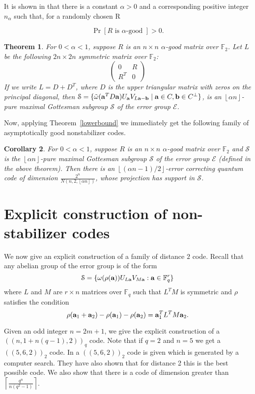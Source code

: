 \documentclass{Rinton-P9x6}
\newtheorem{theorem}{Theorem}[section]
\newtheorem{corollary}[theorem]{Corollary}
\newcommand{\floor}[1]{\ensuremath{\left\lfloor{#1}\right\rfloor}}
\newcommand{\F}{\ensuremath{\mathbb{F}}}
\newcommand{\GF}[2][]{{\ensuremath{\mathbb{F}_{#2}^{#1}}}}
\renewcommand{\a}{{\bf a}}
\renewcommand{\b}{{\bf b}}
\newcommand{\w}{\tilde{\omega}}
\renewcommand{\S}{{\ensuremath{\mathcal{S}}}}
\newcommand{\E}{{\ensuremath{\mathcal{E}}}}
\begin{document}
It is shown in\cite{AP02} that there is a constant $\alpha>0$ and a
corresponding positive integer $n_{\alpha}$ such that, for a randomly chosen R

\[
\Pr[R\mbox{ is $\alpha$-good }]>0.
\]
 
\begin{theorem}\label{exists}
  For $0<\alpha<1$, suppose $R$ is an $n\times n$ $\alpha$-good matrix
  over $\F_2$.  Let $L$ be the following $2n\times 2n$ symmetric
  matrix over $\F_2$:
\[
\left( \begin{array}{cc}
       0 & R \\
       R^T & 0 
       \end{array}   
\right)
\]
If we write $L=D+D^T$, where $D$ is the upper triangular matrix with
zeros on the principal diagonal, then $\S=\{\w(\a^TD\a)U_{\a}V_{L\a
  -\b}\mid \a\in C, \b\in C^{\perp}\}$, is an $\floor{\alpha n}$-pure
maximal Gottesman subgroup $\S$ of the error group $\E$.
\end{theorem}

Now, applying Theorem~\ref{lowerbound} we immediately get the following
family of asymptotically good nonstabilizer codes.

\begin{corollary}\label{asymp-good}
  For $0<\alpha<1$, suppose $R$ is an $n\times n$ $\alpha$-good matrix
  over $\F_2$ and $\S$ is the $\floor{\alpha n}$-pure maximal Gottesman
  subgroup $\S$ of the error group $\E$ (defined in the above
  theorem).  Then there is an $\floor{(\alpha n-1)/2}$-error correcting
  quantum code of dimension $\frac{2^n}{N(n,2,\floor{\alpha n})}$,
  whose projection has support in $\S$.
\end{corollary}

\section{Explicit construction of non-stabilizer codes}\label{explicit}

We now give an explicit construction of a family of distance $2$ code.
Recall that any abelian group of the error group is of the form
\[
\S = \{ \omega(\rho(\a)) U_{L\a}V_{M\a} : \a \in \GF[r]{q} \}
\]
where $L$ and $M$ are $r \times n$ matrices over \GF{q} such that $L^T
M$ is symmetric and $\rho$ satisfies the condition
\[
\rho(\a_1 + \a_2 ) - \rho(\a_1) - \rho(\a_2) = \a_1^T L^T M \a_2.
\] 

Given an odd integer $n = 2m + 1$, we give the explicit construction
of a $((n,1+n(q-1),2))_q$ code. Note that if $q =2$ and $n=5$ we get a
$((5,6,2))_2$ code. In\cite{rains97nonadditive} a $((5,6,2))_2$ code
is given which is generated by a computer search. They have also shown
that for distance 2 this is the best possible code. We also show that
there is a code of dimension greater than $\left\lceil
  \frac{q^n}{n(q^2-1)} \right\rceil$.
\end{document}
